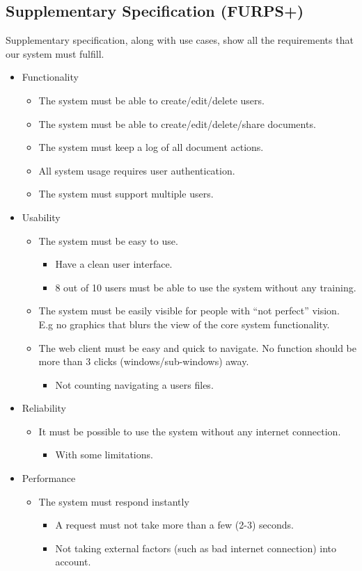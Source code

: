 \documentclass[11pt]{article}
\begin{document}
\subsection{Supplementary Specification (FURPS+)}
\label{sec-2-2}
Supplementary specification, along with use cases, show all the requirements that our system must fulfill.

\begin{itemize}
\item Functionality
\begin{itemize}
\item The system must be able to create/edit/delete users.
\item The system must be able to create/edit/delete/share documents.
\item The system must keep a log of all document actions.
\item All system usage requires user authentication.
\item The system must support multiple users.
\end{itemize}
\item Usability
\begin{itemize}
\item The system must be easy to use.
\begin{itemize}
\item Have a clean user interface.
\item 8 out of 10 users must be able to use the system without any training.
\end{itemize}
\item The system must be easily visible for people with ``not perfect'' vision. 
       E.g no graphics that blurs the view of the core system functionality.
\item The web client must be easy and quick to navigate. No function should 
       be more than 3 clicks (windows/sub-windows) away.
\begin{itemize}
\item Not counting navigating a users files.
\end{itemize}
\end{itemize}
\item Reliability
\begin{itemize}
\item It must be possible to use the system without any internet connection.
\begin{itemize}
\item With some limitations.
\end{itemize}
\end{itemize}
\item Performance
\begin{itemize}
\item The system must respond instantly
\begin{itemize}
\item A request must not take more than a few (2-3) seconds.
\item Not taking external factors (such as bad internet connection) into account.
\end{itemize}
\end{itemize}
\end{itemize}
\newpage
\end{document}
